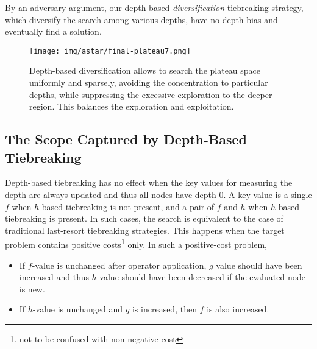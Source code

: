 By an adversary argument, our depth-based \emph{diversification}
tiebreaking strategy, which diversify the search among various depths,
have no depth bias and eventually find a solution.

\begin{figure}[htbp]
 \centering
 \texttt{[image: img/astar/final-plateau7.png]}
 \caption{Depth-based diversification allows \astar to search the plateau space
 uniformly and sparsely, avoiding the concentration to particular depths, while
 suppressing the excessive exploration to the deeper region. This
 balances the exploration and exploitation.}
 \label{fig:plateau-depiction-all-optimal}
\end{figure}


\subsection{The Scope Captured by Depth-Based Tiebreaking}

Depth-based tiebreaking has no effect when the key values for measuring
the depth are always updated and thus all nodes have depth 0. A key
value is a single $f$ when $h$-based tiebreaking is not present, and a
pair of $f$ and $h$ when $h$-based tiebreaking is present.  In such
cases, the search is equivalent to the case of traditional last-resort
tiebreaking strategies.
% 
This happens when the target problem contains
positive costs\footnote{not to be confused with non-negative cost} only.
In such a positive-cost problem,
\begin{itemize}
 \item If $f$-value is unchanged after operator application, $g$ value
       should have been increased and thus $h$ value should have been
       decreased if the evaluated node is new.
 \item If $h$-value is unchanged and $g$ is increased, then $f$ is also increased.
\end{itemize}

% 


